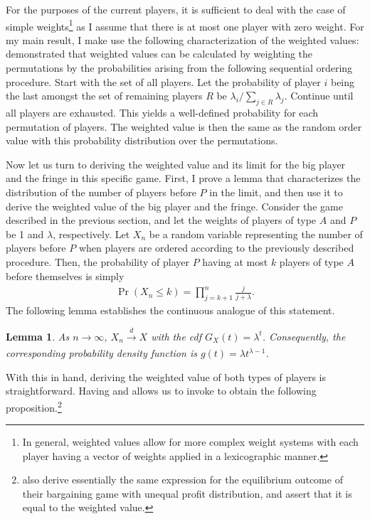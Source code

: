 \documentclass[a4paper]{article}
\newtheorem{lemma}{Lemma}
\begin{document}
For the purposes of the current players, it is sufficient to deal with the case of simple weights\footnote{
    In general, weighted values allow for more complex weight systems with each player having a vector of weights applied in a lexicographic manner.
}
as I assume that there is at most one player with zero weight.
For my main result, I make use the following characterization of the weighted values: \textcite{kalai1987weighted} demonstrated that weighted values can be calculated by weighting the permutations by the probabilities arising from the following sequential ordering procedure.
Start with the set of all players.
Let the probability of player $i$ being the last amongst the set of remaining players $R$ be $\lambda_i / \sum_{j \in R} \lambda_j$.
Continue until all players are exhausted.
This yields a well-defined probability for each permutation of players.
The weighted value is then the same as the random order value with this probability distribution over the permutations.

Now let us turn to deriving the weighted value and its limit for the big player and the fringe in this specific game.
First, I prove a lemma that characterizes the distribution of the number of players before $P$ in the limit, and then use it to derive the weighted value of the big player and the fringe.
Consider the game described in the previous section, and let the weights of players of type $A$ and $P$ be 1 and $\lambda$, respectively.
Let $X_n$ be a random variable representing the number of players before $P$ when players are ordered according to the previously described procedure.
Then, the probability of player $P$ having at most $k$ players of type $A$ before themselves is simply
\begin{align}
    \label{eq:entry_distr_discrete}
    \Pr(X_n \leq k) = \prod_{j=k+1}^n \frac{j}{j + \lambda}.
\end{align}
The following lemma establishes the continuous analogue of this statement.
\begin{lemma}
    \label{lem:entry_distr}
    As $n \to \infty$, $X_n \xrightarrow[]{d} X$ with the cdf $G_X(t) = \lambda^t$.
    Consequently, the corresponding probability density function is $g(t) = \lambda t^{\lambda - 1}$.
\end{lemma}

With this in hand, deriving the weighted value of both types of players is straightforward.
Having  and  allows us to invoke  to obtain the following proposition.\footnote{
    \textcite{stole1996intra} also derive essentially the same expression for the equilibrium outcome of their bargaining game with unequal profit distribution, and assert that it is equal to the weighted value.
}
\end{document}
